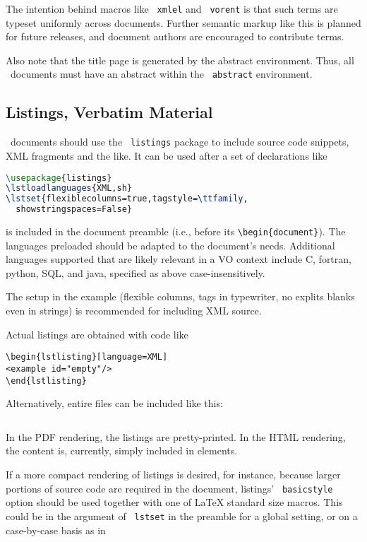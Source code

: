 \documentclass[11pt,a4paper]{ivoa}
\newcommand{\texword}[1]{\texttt{\color{texcolor} #1}}
\begin{document}
The intention behind macros like \texword{xmlel} and \texword{vorent} is
that such terms are typeset uniformly across documents.  Further
semantic markup like this is planned for future releases, and document
authors are encouraged to contribute terms.

Also note that the title page is generated by the abstract environment.
Thus, all \ivoatex\ documents must have an abstract within the
\texword{abstract} environment.

\subsection{Listings, Verbatim Material}

\ivoatex\ documents should use the \texword{listings} package to include
source code snippets, XML fragments and the like.  It can be used after
a set of declarations like
\begin{lstlisting}[language=TeX]
\usepackage{listings}
\lstloadlanguages{XML,sh}
\lstset{flexiblecolumns=true,tagstyle=\ttfamily,
  showstringspaces=False}
\end{lstlisting}
is included in the document preamble (i.e., before its
\verb|\begin{document}|). The languages preloaded should be adapted to
the document's needs.  Additional
languages supported that are likely relevant in a VO context include C,
fortran, python, SQL, and java, specified as above case-insensitively.

The setup in the example (flexible columns, tags in
typewriter, no explits blanks even in strings) 
is recommended for including XML source.

Actual listings are obtained with code like
\begin{verbatim}
\begin{lstlisting}[language=XML]
<example id="empty"/>
\end{lstlisting}
\end{verbatim}
Alternatively, entire files can be included like this:
\begin{verbatim}

\end{verbatim}
In the PDF rendering, the listings are pretty-printed.  In the HTML
rendering, the content is, currently, simply included in  elements.

If a more compact rendering of listings is desired, for instance,
because larger portions of source code are required in the document,
listings' \texword{basicstyle} option should be used together with one
of LaTeX standard size macros.  This could be in the argument of
\texword{lstset} in the preamble for a global setting, or on a
case-by-case basis as in
\end{document}
